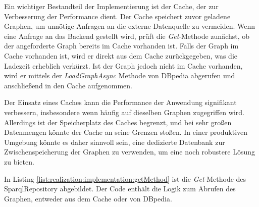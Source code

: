 Ein wichtiger Bestandteil der Implementierung ist der Cache, der zur Verbesserung der Performance dient. Der Cache speichert zuvor geladene Graphen, um unnötige Anfragen an die externe Datenquelle zu vermeiden. Wenn eine Anfrage an das Backend gestellt wird, prüft die \textit{Get}-Methode zunächst, ob der angeforderte Graph bereits im Cache vorhanden ist. Falls der Graph im Cache vorhanden ist, wird er direkt aus dem Cache zurückgegeben, was die Ladezeit erheblich verkürzt. Ist der Graph jedoch nicht im Cache vorhanden, wird er mittels der \textit{LoadGraphAsync} Methode von DBpedia abgerufen und anschließend in den Cache aufgenommen.

Der Einsatz eines Caches kann die Performance der Anwendung signifikant verbessern, insbesondere wenn häufig auf dieselben Graphen zugegriffen wird. Allerdings ist der Speicherplatz des Caches begrenzt, und bei sehr großen Datenmengen könnte der Cache an seine Grenzen stoßen. In einer produktiven Umgebung könnte es daher sinnvoll sein, eine dedizierte Datenbank zur Zwischenspeicherung der Graphen zu verwenden, um eine noch robustere Lösung zu bieten.

In Listing \ref{list:realization:implementation:getMethod} ist die \textit{Get}-Methode des SparqlRepository abgebildet. Der Code enthält die Logik zum Abrufen des Graphen, entweder aus dem Cache oder von DBpedia.

